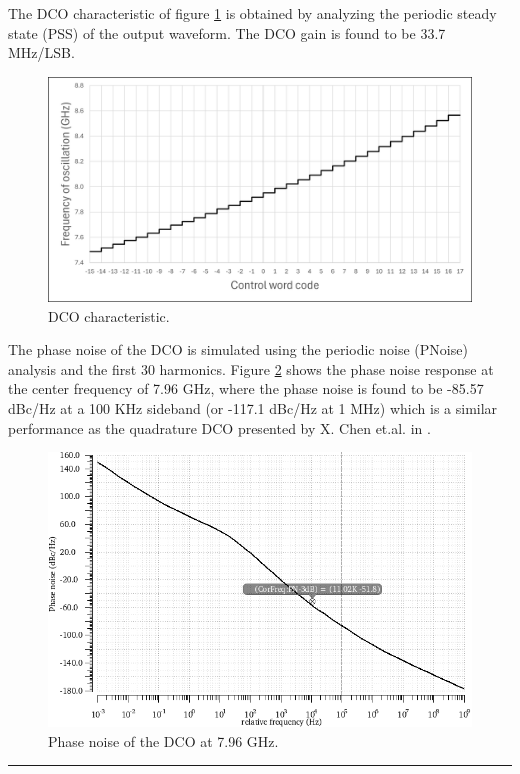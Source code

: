 The DCO characteristic of figure \ref{fig:DCO_characteristic} is obtained by analyzing the periodic steady state (PSS) of the output waveform. The DCO gain is found to be 33.7 MHz/LSB.

\begin{figure}[H]
    \centering
    \includegraphics[width=1\textwidth]{figures/DCO_characteristic.png}
    \caption{DCO characteristic.}
    \label{fig:DCO_characteristic}
\end{figure}

The phase noise of the DCO is simulated using the periodic noise (PNoise) analysis and the first 30 harmonics. Figure \ref{fig:DCO_phase_noise} shows the
phase noise response at the center frequency of 7.96 GHz, where the phase noise is found to be -85.57 dBc/Hz at a 100 KHz sideband (or -117.1 dBc/Hz at 1 MHz) which is
a similar performance as the quadrature DCO presented by X. Chen et.al. in \cite{DCO_Chen2023}.

\begin{figure}[H]
    \centering
    \includegraphics[width=1\textwidth]{figures/DCO_phase_noise.png}
    \caption{Phase noise of the DCO at 7.96 GHz.}
    \label{fig:DCO_phase_noise}
\end{figure}

\noindent\rule{\textwidth}{1pt}